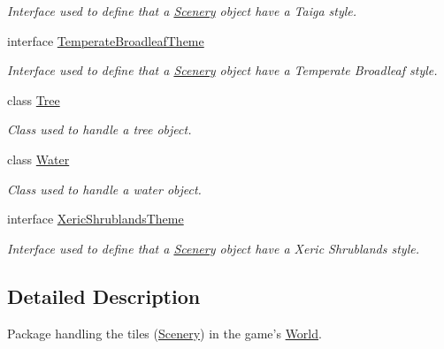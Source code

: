 \begin{DoxyCompactItemize}
\begin{DoxyCompactList}\small\item\em Interface used to define that a \hyperlink{classworld_1_1scenery_1_1_scenery}{Scenery} object have a Taiga style. \end{DoxyCompactList}\item 
interface \hyperlink{interfaceworld_1_1scenery_1_1_temperate_broadleaf_theme}{Temperate\-Broadleaf\-Theme}
\begin{DoxyCompactList}\small\item\em Interface used to define that a \hyperlink{classworld_1_1scenery_1_1_scenery}{Scenery} object have a Temperate Broadleaf style. \end{DoxyCompactList}\item 
class \hyperlink{classworld_1_1scenery_1_1_tree}{Tree}
\begin{DoxyCompactList}\small\item\em Class used to handle a tree object. \end{DoxyCompactList}\item 
class \hyperlink{classworld_1_1scenery_1_1_water}{Water}
\begin{DoxyCompactList}\small\item\em Class used to handle a water object. \end{DoxyCompactList}\item 
interface \hyperlink{interfaceworld_1_1scenery_1_1_xeric_shrublands_theme}{Xeric\-Shrublands\-Theme}
\begin{DoxyCompactList}\small\item\em Interface used to define that a \hyperlink{classworld_1_1scenery_1_1_scenery}{Scenery} object have a Xeric Shrublands style. \end{DoxyCompactList}\end{DoxyCompactItemize}


\subsection{Detailed Description}
Package handling the tiles (\hyperlink{classworld_1_1scenery_1_1_scenery}{Scenery}) in the game's \hyperlink{classworld_1_1_world}{World}. 